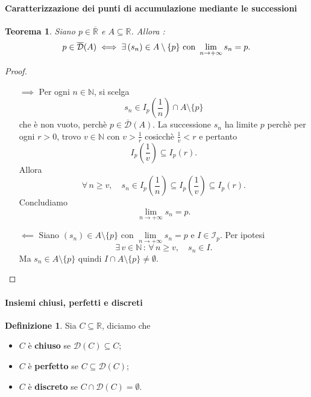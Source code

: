 \documentclass{article}
\theoremstyle{plain}
\newtheorem{thm}{Teorema}[section]
\theoremstyle{definition}
\newtheorem{defn}{Definizione}[section]
\theoremstyle{remark}
\begin{document}
\paragraph{Caratterizzazione dei punti di accumulazione mediante le successioni}
\begin{bxthm}
\begin{thm}\label{prec}
    Siano $p\in \overline{\mathbb{R}}$ e $A\subseteq\mathbb{R}$. Allora :
    \[p\in\overline{\mathcal{D}}(A)\iff\exists\, (s_n)\in A\setminus\{p\}\textup{ con }\lim\limits_{n\to+\infty}s_n=p.\]
\end{thm}
\end{bxthm}
\begin{proof}\hfill
    \begin{itemize}
        \item[$\implies$]
        Per ogni $n\in \mathbb{N}$, si scelga \[s_n\in I_p\left(\dfrac{1}{n}\right)\cap A\setminus\{p\}\]
        che è non vuoto, perchè $p\in\overline{\mathcal{D}}(A)$. 
        La successione $s_n$ ha limite $p$ perchè per ogni $r>0$, trovo $v\in \mathbb{N}$ con $v>\frac{1}{r}$ 
        cosicchè $\frac{1}{v}<r$ e pertanto 
        \[I_p\left(\dfrac{1}{v}\right)\subseteq I_p(r).\]
        Allora 
        \[\forall\,n\geq v,\quad s_n\in I_p\left(\dfrac{1}{n}\right)\subseteq I_p\left(\dfrac{1}{v}\right)\subseteq I_p(r).\]
        Concludiamo \[\lim_{n\to+\infty}s_n=p.\]
        \item[$\impliedby$]
        Siano $(s_n)\in A\setminus\{p\}$ con $\lim\limits_{n\to+\infty}s_n=p$ e $I\in \mathcal{I}_p$. 
        Per ipotesi 
        \[\exists\,v\in \mathbb{N}\,:\,\forall\,n\geq v,\quad s_n\in I.\]
        Ma $s_n\in A\setminus\{p\}$ quindi $I\cap A\setminus\{p\}\neq\emptyset$.
    \end{itemize}
\end{proof}

\vspace{10pt}

\paragraph{Insiemi chiusi, perfetti e discreti}
\begin{bxthm}
\begin{defn}
    Sia $C\subseteq \mathbb{R}$, diciamo che 
    \begin{itemize}
        \item $C$ è \textbf{chiuso} se $\mathcal{D}(C)\subseteq C$;
        \item $C$ è \textbf{perfetto} se $C\subseteq \mathcal{D}(C)$;
        \item $C$ è \textbf{discreto} se $C\cap \mathcal{D}(C)=\emptyset$.
    \end{itemize}
\end{defn}
\end{bxthm}
\end{document}
